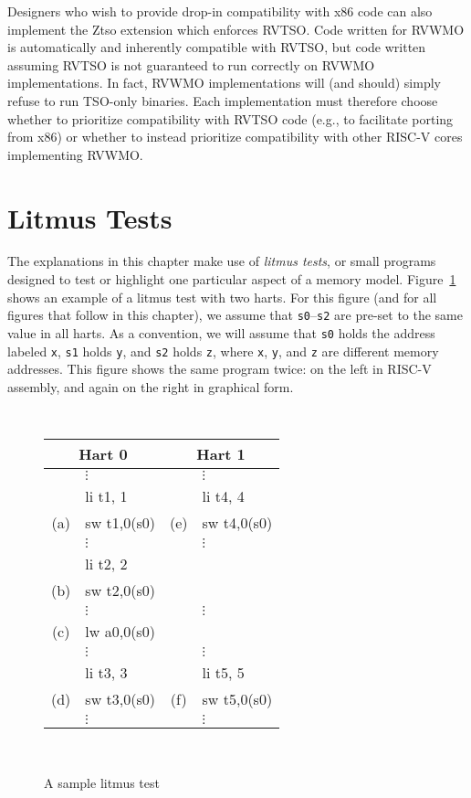 Designers who wish to provide drop-in compatibility with x86 code can also implement the Ztso extension which enforces RVTSO.
Code written for RVWMO is automatically and inherently compatible with RVTSO, but code written assuming RVTSO is not guaranteed to run correctly on RVWMO implementations.
In fact, RVWMO implementations will (and should) simply refuse to run TSO-only binaries.
Each implementation must therefore choose whether to prioritize compatibility with RVTSO code (e.g., to facilitate porting from x86) or whether to instead prioritize compatibility with other RISC-V cores implementing RVWMO.

\section{Litmus Tests}
The explanations in this chapter make use of {\em litmus tests}, or small programs designed to test or highlight one particular aspect of a memory model.
Figure~\ref{fig:litmus:sample} shows an example of a litmus test with two harts.
For this figure (and for all figures that follow in this chapter), we assume that {\tt s0}--{\tt s2} are pre-set to the same value in all harts.
As a convention, we will assume that {\tt s0} holds the address labeled {\tt x}, {\tt s1} holds {\tt y}, and {\tt s2} holds {\tt z}, where {\tt x}, {\tt y}, and {\tt z} are different memory addresses.
This figure shows the same program twice: on the left in RISC-V assembly, and again on the right in graphical form.

\begin{figure}[h!]
  \centering
  {
    \tt\small
    \begin{tabular}{cl||cl}
    \multicolumn{2}{c}{Hart 0} & \multicolumn{2}{c}{Hart 1} \\
    \hline
          & $\vdots$    &     & $\vdots$    \\
          & li t1, 1    &     & li t4, 4    \\
      (a) & sw t1,0(s0) & (e) & sw t4,0(s0) \\
          & $\vdots$    &     & $\vdots$    \\
          & li t2, 2    &     &             \\
      (b) & sw t2,0(s0) &     &             \\
          & $\vdots$    &     & $\vdots$    \\
      (c) & lw a0,0(s0) &     &             \\
          & $\vdots$    &     & $\vdots$    \\
          & li t3, 3    &     & li t5, 5    \\
      (d) & sw t3,0(s0) & (f) & sw t5,0(s0) \\
          & $\vdots$    &     & $\vdots$    \\
    \end{tabular}
  }
  ~~~~
  \diagram
  \caption{A sample litmus test}
  \label{fig:litmus:sample}
\end{figure}

